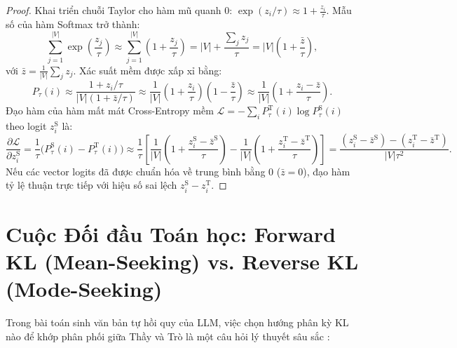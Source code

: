 \begin{proof}
Khai triển chuỗi Taylor cho hàm mũ quanh $0$: $\exp(z_i / \tau) \approx 1 + \frac{z_i}{\tau}$.
Mẫu số của hàm Softmax trở thành:
\begin{equation}
    \sum_{j=1}^{|V|} \exp\left(\frac{z_j}{\tau}\right) \approx \sum_{j=1}^{|V|} \left(1 + \frac{z_j}{\tau}\right) = |V| + \frac{\sum_j z_j}{\tau} = |V| \left( 1 + \frac{\bar{z}}{\tau} \right),
\end{equation}
với $\bar{z} = \frac{1}{|V|}\sum_{j} z_j$. Xác suất mềm được xấp xỉ bằng:
\begin{equation}
    P_\tau(i) \approx \frac{1 + z_i / \tau}{|V| (1 + \bar{z}/\tau)} \approx \frac{1}{|V|} \left( 1 + \frac{z_i}{\tau} \right) \left( 1 - \frac{\bar{z}}{\tau} \right) \approx \frac{1}{|V|} \left( 1 + \frac{z_i - \bar{z}}{\tau} \right).
\end{equation}
Đạo hàm của hàm mất mát Cross-Entropy mềm $\mathcal{L} = -\sum_i P_\tau^{\text{T}}(i) \log P_\tau^{\text{S}}(i)$ theo logit $z_i^{\text{S}}$ là:
\begin{equation}
    \frac{\partial \mathcal{L}}{\partial z_i^{\text{S}}} = \frac{1}{\tau} \big( P_\tau^{\text{S}}(i) - P_\tau^{\text{T}}(i) \big) \approx \frac{1}{\tau} \left[ \frac{1}{|V|} \left( 1 + \frac{z_i^{\text{S}} - \bar{z}^{\text{S}}}{\tau} \right) - \frac{1}{|V|} \left( 1 + \frac{z_i^{\text{T}} - \bar{z}^{\text{T}}}{\tau} \right) \right] = \frac{(z_i^{\text{S}} - \bar{z}^{\text{S}}) - (z_i^{\text{T}} - \bar{z}^{\text{T}})}{|V|\tau^2}.
\end{equation}
Nếu các vector logits đã được chuẩn hóa về trung bình bằng $0$ ($\bar{z} = 0$), đạo hàm tỷ lệ thuận trực tiếp với hiệu số sai lệch $z_i^{\text{S}} - z_i^{\text{T}}$.
\end{proof}

\section{Cuộc Đối đầu Toán học: Forward KL (Mean-Seeking) vs. Reverse KL (Mode-Seeking)}
\label{sec:forward_vs_reverse_kl}

Trong bài toán sinh văn bản tự hồi quy của LLM, việc chọn hướng phân kỳ KL nào để khớp phân phối giữa Thầy và Trò là một câu hỏi lý thuyết sâu sắc \citep{gu2024minillm, agarwal2024onpolicy}:

